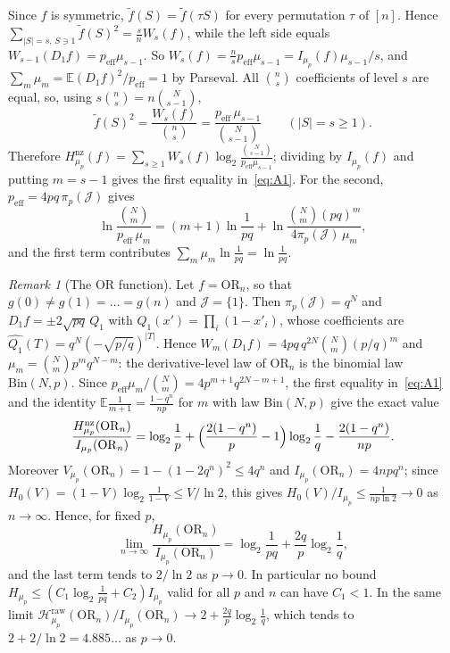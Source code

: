 \documentclass[11pt]{amsart}
\theoremstyle{remark}
\newtheorem{remark}[lemma]{Remark}
\newcommand{\Hraw}{\mathcal{H}^{\mathrm{raw}}}
\newcommand{\peff}{p_{\mathrm{eff}}}
\newcommand{\J}{\mathcal{J}}
\newcommand{\ft}{\tilde f}
\begin{document}
Since $f$ is symmetric, $\ft(S) = \ft(\tau S)$ for every permutation $\tau$ of $[n]$. Hence $\sum_{|S| = s,\, S \ni 1} \ft(S)^2 = \frac{s}{n} W_s(f)$, while the left side equals $W_{s-1}(D_1 f) = \peff \mu_{s-1}$. So $W_s(f) = \frac{n}{s}\peff\mu_{s-1} = I_{\mu_p}(f)\mu_{s-1}/s$, and $\sum_m \mu_m = \mathbb{E}(D_1 f)^2/\peff = 1$ by Parseval. All $\binom{n}{s}$ coefficients of level $s$ are equal, so, using $s\binom{n}{s} = n\binom{N}{s-1}$,
\[
\ft(S)^2 = \frac{W_s(f)}{\binom{n}{s}} = \frac{\peff\, \mu_{s-1}}{\binom{N}{s-1}} \qquad (|S| = s \ge 1).
\]
Therefore $H^{\mathrm{nz}}_{\mu_p}(f) = \sum_{s \ge 1} W_s(f) \log_2 \frac{\binom{N}{s-1}}{\peff \mu_{s-1}}$; dividing by $I_{\mu_p}(f)$ and putting $m = s - 1$ gives the first equality in~\eqref{eq:A1}. For the second, $\peff = 4pq\,\pi_p(\J)$ gives
\[
\ln \frac{\binom{N}{m}}{\peff\, \mu_m} = (m+1) \ln \frac{1}{pq} + \ln \frac{\binom{N}{m} (pq)^m}{4 \pi_p(\J)\, \mu_m},
\]
and the first term contributes $\sum_m \mu_m \ln\frac{1}{pq} = \ln\frac{1}{pq}$.

\begin{remark}[The OR function]\label{rem:or}
Let $f = \mathrm{OR}_n$, so that $g(0) \ne g(1) = \dots = g(n)$ and $\J = \{1\}$. Then $\pi_p(\J) = q^N$ and $D_1 f = \pm 2\sqrt{pq}\, Q_1$ with $Q_1(x') = \prod_{i}(1 - x'_i)$, whose coefficients are $\widehat{Q_1}(T) = q^N (-\sqrt{p/q})^{|T|}$. Hence $W_m(D_1 f) = 4pq\, q^{2N} \binom{N}{m} (p/q)^m$ and $\mu_m = \binom{N}{m} p^m q^{N-m}$: the derivative-level law of $\mathrm{OR}_n$ is the binomial law $\mathrm{Bin}(N, p)$. Since $\peff \mu_m / \binom{N}{m} = 4 p^{m+1} q^{2N - m + 1}$, the first equality in~\eqref{eq:A1} and the identity $\mathbb{E}\frac{1}{m+1} = \frac{1 - q^n}{np}$ for $m$ with law $\mathrm{Bin}(N, p)$ give the exact value
\[
\frac{H^{\mathrm{nz}}_{\mu_p}(\mathrm{OR}_n)}{I_{\mu_p}(\mathrm{OR}_n)} = \log_2 \frac1p + \Bigl(\frac{2(1 - q^n)}{p} - 1\Bigr) \log_2 \frac1q - \frac{2(1 - q^n)}{np}.
\]
Moreover $V_{\mu_p}(\mathrm{OR}_n) = 1 - (1 - 2q^n)^2 \le 4q^n$ and $I_{\mu_p}(\mathrm{OR}_n) = 4npq^n$; since $H_0(V) = (1-V)\log_2\frac{1}{1-V} \le V/\ln 2$, this gives $H_0(V)/I_{\mu_p} \le \frac{1}{np \ln 2} \to 0$ as $n \to \infty$. Hence, for fixed $p$,
\begin{equation}\label{eq:or-limit}
\lim_{n \to \infty} \frac{H_{\mu_p}(\mathrm{OR}_n)}{I_{\mu_p}(\mathrm{OR}_n)} = \log_2 \frac{1}{pq} + \frac{2q}{p} \log_2 \frac1q ,
\end{equation}
and the last term tends to $2/\ln 2$ as $p \to 0$. In particular no bound $H_{\mu_p} \le (C_1 \log_2 \frac{1}{pq} + C_2) I_{\mu_p}$ valid for all $p$ and $n$ can have $C_1 < 1$. In the same limit $\Hraw_{\mu_p}(\mathrm{OR}_n)/I_{\mu_p}(\mathrm{OR}_n) \to 2 + \frac{2q}{p}\log_2\frac1q$, which tends to $2 + 2/\ln 2 = 4.885\dots$ as $p \to 0$.
\end{remark}
\end{document}
